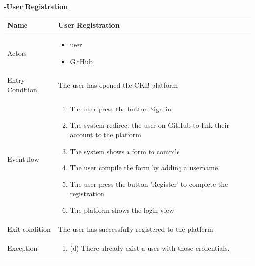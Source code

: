 \begin{enumerate}[label=\textbf{[UC\arabic*]}]
    \item \textbf{-User Registration}
    \\ \begin{tabular}{|l|p{11cm}|}
        \hline
        Name & User Registration \\
        \hline
        Actors & \begin{itemize}
                    \item user
                    \item GitHub
                \end{itemize} \\
        \hline
        Entry Condition & The user has opened the CKB platform\\
        \hline
        Event flow & \begin{enumerate} 
            \item The user press the button Sign-in
            \item The system redirect the user on GitHub to link their account to the platform
            \item The system shows a form to compile
            \item The user compile the form by adding a username
            \item The user press the button 'Register' to complete the registration
            \item The platform shows the login view
        \end{enumerate}\\
        \hline
        Exit condition & The user has successfully registered to the platform \\
        \hline
        Exception & \begin{enumerate} [label={}, leftmargin=0.25cm ]
            \item (d) There already exist a user with those credentials.
        \end{enumerate}  \\
        \hline            
    \end{tabular}
\newpage
    

\end{enumerate}
